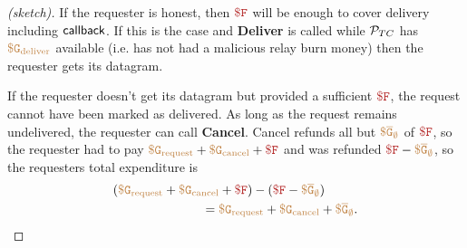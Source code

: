 \begin{proof}[(sketch)]
If the requester is honest, then $\fee$ will be enough to cover delivery including ${\sf callback}$.
If this is the case and {\bf Deliver} is called while ${\cal P}_{TC}$ has $\tt {\color{brown} \$G_\text{deliver} }$ available (i.e. has not had a malicious relay burn money)
then the requester gets its datagram.

If the requester doesn't get its datagram but provided a sufficient $\fee$, the request cannot have been marked as delivered.
As long as the request remains undelivered, the requester can call {\bf Cancel}.
Cancel refunds all but $\tt {\color{brown} \$\overline{G}_\emptyset }$ of $\fee$, so the requester had to pay $\gasrequest + \gascancel + \fee$ and was refunded $\fee - \constgascancel$, so the requesters total expenditure is
\begin{align*}
  (\gasrequest + \gascancel + \fee) - (\fee - \constgascancel& ) \\ = \gasrequest + \gascancel & + \constgascancel.
\end{align*}
\end{proof}



